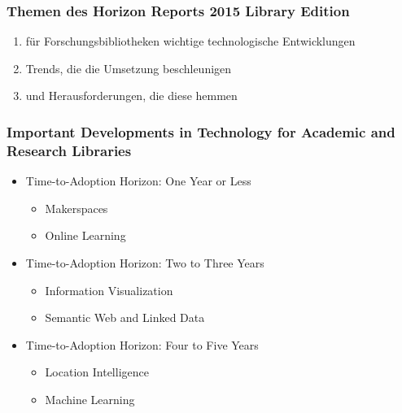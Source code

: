 
\begin{frame}[c]\frametitle<beamer>{Themen des Horizon Reports 2015 Library Edition}
    \begin{enumerate}
      \item für Forschungsbibliotheken wichtige technologische Entwicklungen
      \item Trends, die die Umsetzung beschleunigen
      \item und Herausforderungen, die diese hemmen
    \end{enumerate}
\end{frame}

 \begin{frame}    
    \frametitle{Important Developments in Technology for Academic and Research Libraries}

    \pause

      \begin{itemize}
        \item Time-to-Adoption Horizon: One Year or Less
          \begin{itemize}
            \item Makerspaces
            \item Online Learning
          \end{itemize}

        \item Time-to-Adoption Horizon: Two to Three Years
          \begin{itemize}
            \item Information Visualization
            \item Semantic Web and Linked Data
          \end{itemize}

        \item Time-to-Adoption Horizon: Four to Five Years
          \begin{itemize}
            \item Location Intelligence
            \item Machine Learning
          \end{itemize}
      \end{itemize}
  \end{frame}

